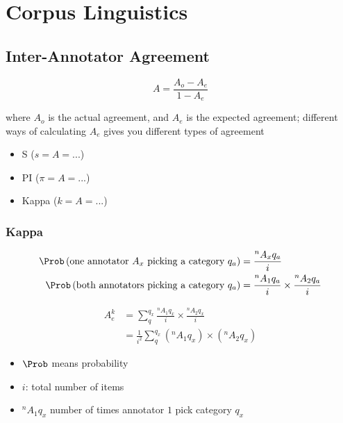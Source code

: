 \chapter{Corpus Linguistics}

\section{Inter-Annotator Agreement}

  \begin{equation}
    A = \frac{A_{o} - A_{e}}{1 - A_{e}}
  \end{equation}

  where $ A_{o} $ is the actual agreement, and $ A_{e} $ is the expected
  agreement; different ways of calculating $ A_{e} $ gives you different
  types of agreement

  \begin{itemize}
    \item S ($ s = A = ... $)
    \item PI ($ \pi = A = ... $)
    \item Kappa ($ k = A = ... $)
  \end{itemize}

  \subsection{Kappa}

    \begin{align}
      \Prob
      \left(
        \text{one annotator $ A_{x} $ picking a category $ q_{a} $}
      \right) &= \frac{^{n} A_{x} q_{a}}{i} \\
      \Prob
      \left(
        \text{both annotators picking a category $ q_{a} $}
      \right) &= \frac{^{n} A_{1} q_{a}}{i} \times \frac{^{n} A_{2} q_{a}}{i}
    \end{align}

    \begin{align}
      A_{e}^{k}
        &= \sum_{q}^{q_{x}} \frac{^{n} A_{1} q_{x}}{i} \times \frac{^{n} A_{2} q_{x}}{i} \\
        &= \frac{1}{i^{2}} \sum_{q}^{q_{x}} \left( ^{n} A_{1} q_{x} \right) \times \left( ^{n} A_{2} q_{x} \right)
    \end{align}

    \begin{itemize}
      \item $ \Prob $ means probability
      \item $ i $: total number of items
      \item $ ^{n} A_{1} q_{x} $ number of times annotator $ 1 $ pick category $ q_{x} $
    \end{itemize}
